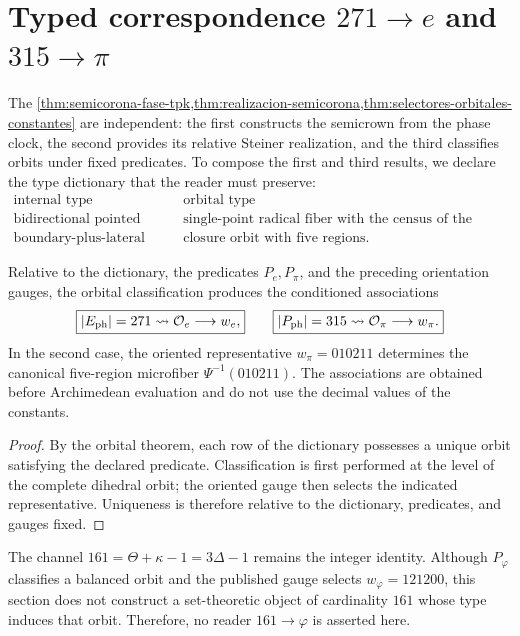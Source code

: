 \section{Typed correspondence \texorpdfstring{\(271\to e\) and
\(315\to\pi\)}{271 to e and 315 to pi}}

The
\cref{thm:semicorona-fase-tpk,thm:realizacion-semicorona,thm:selectores-orbitales-constantes}
are independent: the first constructs
the semicrown from the phase clock, the second provides its relative Steiner
realization, and the third classifies orbits under fixed predicates. To
compose the first and third results, we declare the
type dictionary that the reader must preserve:
\[
\begin{array}{c|c}
\text{internal type}&\text{orbital type}\\
\hline
\text{bidirectional pointed return}&
\text{single-point radical fiber with the census of the regional branch}\\
\text{boundary-plus-lateral closure}&
\text{closure orbit with five regions}.
\end{array}
\]

\begin{corollary}
\label{cor:lectores-enteros-relativos}
Relative to the dictionary, the predicates \(P_e,P_\pi\), and the
preceding orientation gauges, the orbital classification produces the
conditioned associations
\[
 \boxed{|E_{\rm ph}|=271\rightsquigarrow \mathcal O_e
        \longrightarrow w_e,}
 \qquad
 \boxed{|P_{\rm ph}|=315\rightsquigarrow \mathcal O_\pi
        \longrightarrow w_\pi.}
\]
In the second case, the oriented representative \(w_\pi=010211\) determines the
canonical five-region microfiber \(\Psi^{-1}(010211)\). The associations are obtained
before Archimedean evaluation and do not use the decimal values of the
constants.
\end{corollary}

\begin{proof}
By the orbital theorem, each row of the dictionary possesses a unique orbit
satisfying the declared predicate. Classification is first performed at the
level of the complete dihedral orbit; the oriented gauge then selects the
indicated representative. Uniqueness is therefore relative to the
dictionary, predicates, and gauges fixed.
\end{proof}

The channel \(161=\Theta+\kappa-1=3\Delta-1\) remains the integer identity.
Although \(P_\varphi\) classifies a balanced orbit and the published gauge
selects \(w_\varphi=121200\), this section does not construct a
set-theoretic object of cardinality \(161\) whose type induces that orbit. Therefore, no
reader \(161\to\varphi\) is asserted here.

